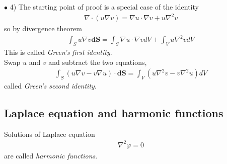 \documentclass[a4paper]{article}
\begin{document}
\begin{rem}
$\bullet$ 4) The starting point of proof is a special case of the identity
\begin{equation*}
\begin{aligned}
\nabla \cdot \left(u\nabla v\right) = \nabla u \cdot \nabla v + u \nabla^2 v
\end{aligned}
\end{equation*}
so by divergence theorem
\begin{equation*}
\begin{aligned}
\int_S u\nabla v \mathbf{dS} = \int_S \nabla u \cdot \nabla v dV + \int_V u \nabla^2 v dV
\end{aligned}
\end{equation*}
This is called \emph{Green's first identity}.\\
Swap $u$ and $v$ and subtract the two equations,
\begin{equation*}
\begin{aligned}
\int_S \left(u\nabla v-v\nabla u\right)\cdot \mathbf{dS} = \int_V \left(u\nabla^2 v - v \nabla^2 u\right) dV
\end{aligned}
\end{equation*}
called \emph{Green's second identity}.
\end{rem}

\subsection{Laplace equation and harmonic functions}
Solutions of Laplace equation
\begin{equation*}
\begin{aligned}
\nabla^2 \varphi = 0
\end{aligned}
\end{equation*}
are called \emph{harmonic functions}.
\end{document}
